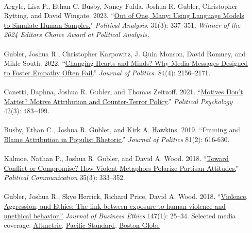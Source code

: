 \documentclass[10pt]{article}
\begin{document}
\ \\
Argyle, Lisa P., Ethan C. Busby, Nancy Fulda, Joshua R. Gubler, Christopher Rytting, and David Wingate. 2023. ``\href{https://www.cambridge.org/core/journals/political-analysis/article/out-of-one-many-using-language-models-to-simulate-human-samples/035D7C8A55B237942FB6DBAD7CAA4E49}{Out of One, Many: Using Language Models to Simulate Human Samples.}" \textit{Political Analysis}. 31(3): 337--351. \textit{Winner of the 2024 Editors Choice Award at Political Analysis.}\\
\ \\
Gubler, Joshua R., Christopher Karpowitz, J. Quin Monson, David Romney, and Mikle South. 2022. ``\href{https://www.journals.uchicago.edu/doi/abs/10.1086/719416}{Changing Hearts and Minds? Why Media Messages Designed to Foster Empathy Often Fail.}'' \textit{Journal of Politics}. 84(4): 2156--2171.\\
\ \\
Canetti, Daphna, Joshua R. Gubler, and Thomas Zeitzoff. 2021. ``\href{https://onlinelibrary.wiley.com/doi/abs/10.1111/pops.12708?af=R}{Motives Don’t Matter? Motive Attribution and Counter-Terror Policy.}'' \textit{Political Psychology} 42(3): 483--499.\\
\ \\
Busby, Ethan C., Joshua R. Gubler, and Kirk A. Hawkins. 2019. ``\href{https://www.journals.uchicago.edu/doi/10.1086/701832}{Framing and Blame Attribution in Populist Rhetoric.}'' \textit{Journal of Politics} 81(2): 616-630.\\
\ \\
Kalmoe, Nathan P., Joshua R. Gubler, and David A. Wood. 2018. ``\href{https://www.tandfonline.com/doi/abs/10.1080/10584609.2017.1341965}{Toward Conflict or Compromise? How Violent Metaphors Polarize Partisan Attitudes.}'' \textit{Political Communication} 35(3): 333--352.\\
\ \\
Gubler, Joshua R., Skye Herrick, Richard Price, David A. Wood. 2018. ``\href{http://link.springer.com/article/10.1007/s10551-015-2926-4}{Violence, Aggression, and Ethics: The link between exposure to human violence and unethical behavior.''} \textit{Journal of Business Ethics} 147(1): 25--34.  Selected media coverage: \href{https://springerlink.altmetric.com/details/4773161}{Altmetric}, \href{https://psmag.com/can-exposure-to-violence-inspire-unethical-behavior-beb83da489da}{Pacific Standard}, \href{https://www.bostonglobe.com/ideas/2015/11/08/violence-breeds-liars-and-cheaters-too/a0lXh0eetdBEjzAy2hvhaJ/story.html}{Boston Globe}\\
\end{document}
